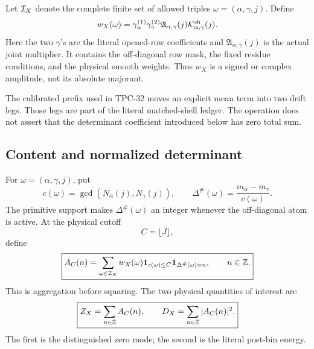 Let \(\mathcal I_X\) denote the complete finite set of allowed triples
\(\omega=(\alpha,\gamma,j)\).  Define
\begin{equation}
 w_X(\omega)
 =
 \gamma_\alpha^{(1)}\gamma_\gamma^{(2)}
 \mathfrak A_{\alpha,\gamma}(j)
 \mathcal K^{\rm sh}_{\alpha,\gamma}(j).
 \label{eq:literal-complete-atom}
\end{equation}
Here the two \(\gamma\)'s are the literal opened-row coefficients and
\(\mathfrak A_{\alpha,\gamma}(j)\) is the actual joint multiplier.  It
contains the off-diagonal row mask, the fixed residue conditions, and
the physical smooth weights.  Thus \(w_X\) is a signed or complex
amplitude, not its absolute majorant.

\begin{remark}
\label{rem:literal-calibration}
The calibrated prefix used in TPC-32 moves an explicit mean term into
two drift legs.  Those legs are part of the literal matched-shell
ledger.  The operation does not assert that the determinant
coefficient introduced below has zero total sum.
\end{remark}

\subsection{Content and normalized determinant}

For \(\omega=(\alpha,\gamma,j)\), put
\begin{equation}
 c(\omega)
 =\gcd(N_\alpha(j),N_\gamma(j)),
 \qquad
 \Delta^\#(\omega)
 =\frac{m_\alpha-m_\gamma}{c(\omega)}.
 \label{eq:literal-content-determinant}
\end{equation}
The primitive support makes \(\Delta^\#(\omega)\) an integer whenever
the off-diagonal atom is active.  At the physical cutoff
\begin{equation}
 \boxed{C=\lfloor J\rfloor,}
 \label{eq:literal-C-equals-J}
\end{equation}
define
\begin{equation}
 \boxed{
 A_C(n)
 =
 \sum_{\omega\in\mathcal I_X}
 w_X(\omega)
 \mathbf 1_{c(\omega)\le C}
 \mathbf 1_{\Delta^\#(\omega)=n},
 \qquad n\in\mathbb Z.}
 \label{eq:literal-AC}
\end{equation}
This is aggregation before squaring.  The two physical quantities of
interest are
\begin{equation}
 \boxed{
 Z_X=\sum_{n\in\mathbb Z}A_C(n),
 \qquad
 D_X=\sum_{n\in\mathbb Z}|A_C(n)|^2.}
 \label{eq:literal-Z-D}
\end{equation}
The first is the distinguished zero mode; the second is the literal
post-bin energy.


